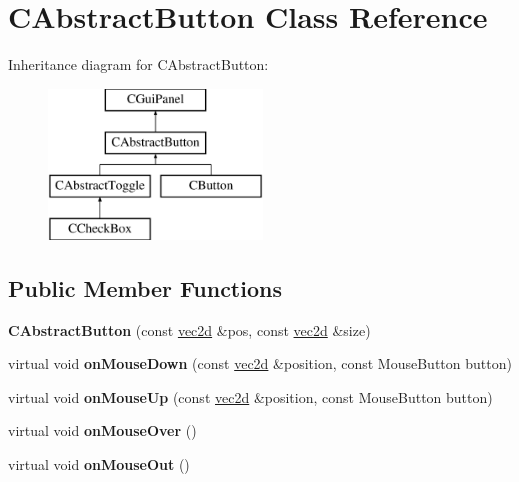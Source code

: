 \hypertarget{class_c_abstract_button}{
\section{CAbstractButton Class Reference}
\label{class_c_abstract_button}
}
Inheritance diagram for CAbstractButton:\begin{figure}[H]
\begin{center}
\leavevmode
\includegraphics[height=4.000000cm]{class_c_abstract_button}
\end{center}
\end{figure}
\subsection*{Public Member Functions}
\begin{DoxyCompactItemize}
\item 
\hypertarget{class_c_abstract_button_aebe8da66b17839a626d25676210e366f}{
{\bfseries CAbstractButton} (const \hyperlink{classvec2d}{vec2d} \&pos, const \hyperlink{classvec2d}{vec2d} \&size)}
\label{class_c_abstract_button_aebe8da66b17839a626d25676210e366f}

\item 
\hypertarget{class_c_abstract_button_a48dfc32c5c3dc4012559b55240bcbcfd}{
virtual void {\bfseries onMouseDown} (const \hyperlink{classvec2d}{vec2d} \&position, const MouseButton button)}
\label{class_c_abstract_button_a48dfc32c5c3dc4012559b55240bcbcfd}

\item 
\hypertarget{class_c_abstract_button_a71cb204ddfd7d678aca1ba18721acbf8}{
virtual void {\bfseries onMouseUp} (const \hyperlink{classvec2d}{vec2d} \&position, const MouseButton button)}
\label{class_c_abstract_button_a71cb204ddfd7d678aca1ba18721acbf8}

\item 
\hypertarget{class_c_abstract_button_a439458155d8e3283adb9ea62ee48c7f2}{
virtual void {\bfseries onMouseOver} ()}
\label{class_c_abstract_button_a439458155d8e3283adb9ea62ee48c7f2}

\item 
\hypertarget{class_c_abstract_button_ac61d5051600b09c9f5d9a93cb5211562}{
virtual void {\bfseries onMouseOut} ()}
\label{class_c_abstract_button_ac61d5051600b09c9f5d9a93cb5211562}

\end{DoxyCompactItemize}
